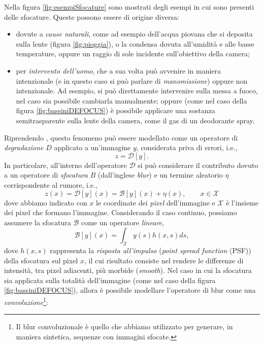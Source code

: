 \noindent Nella figura \ref{fig:esempiSfocature} sono mostrati degli esempi in cui sono presenti delle sfocature. 
Queste possono essere di origine diversa: 
\begin{itemize}
	\item dovute a \textit{cause naturali}, come ad esempio dell'acqua piovana che si deposita sulla lente (figura \ref{fig:pioggia}), o la condensa dovuta all'umidit\`a e alle basse temperature, oppure un raggio di sole incidente sull'obiettivo della camera;
	\item per \textit{intervento dell'uomo}, che a sua volta pu\`o avvenire in maniera intenzionale (e in questo caso si pu\`o parlare di \textit{manomissione}) oppure non intenzionale. Ad esempio, si pu\`o direttamente intervenire sulla messa a fuoco, nel caso sia possibile cambiarla manualmente; oppure (come nel caso della figura \ref{fig:bassiniDEFOCUS}) \`e possibile applicare una sostanza semitrasparente sulla lente della camera, come il gas di un deodorante spray.
\end{itemize}
Riprendendo \cite{alippi2010detecting}, questo fenomeno pu\`o essere modellato come un operatore di \textit{degradazione} $D$ applicato a un'immagine $y$, considerata priva di errori, i.e.,
\begin{equation}
z=\mathcal{D}[y].
\end{equation}
In particolare, all'interno dell'operatore $\mathcal{D}$ si pu\`o considerare il contributo dovuto a un operatore di \textit{sfocatura} $B$ (dall'inglese \textit{blur}) e un termine aleatorio $\eta$ corrispondente al rumore, i.e.,
\begin{equation}
\label{blur_single}
z(x)=\mathcal{D}[y](x) = \mathcal{B}[y](x) + \eta(x), \qquad x \in \mathcal{X}
\end{equation}
dove abbiamo indicato con $x$ le coordinate dei \textit{pixel} dell'immagine e $\mathcal{X}$ \`e l'insieme dei pixel che formano l'immagine. 
Considerando il caso continuo, possiamo assumere la sfocatura $\mathcal{B}$ come un operatore \textit{lineare},
\begin{equation}
\mathcal{B}[y](x) = \int_{\mathcal{X}}y(s)h(x,s)ds,
\end{equation}
dove $h(x,s)$ rappresenta la \textit{risposta all'impulso} (\textit{point spread function} (PSF)) della sfocatura sul pixel $x$, il cui risultato consiste nel rendere le differenze di intensit\`a, tra pixel adiacenti, pi\`u morbide (\textit{smooth}).
Nel caso in cui la sfocatura sia applicata sulla totalit\`a dell'immagine (come nel caso della figura \ref{fig:bassiniDEFOCUS}), allora \`e possibile modellare l'operatore di blur come una \textit{convoluzione}\footnote{Il blur convoluzionale \`e quello che abbiamo utilizzato per generare, in maniera sintetica, sequenze con immagini sfocate.}:
